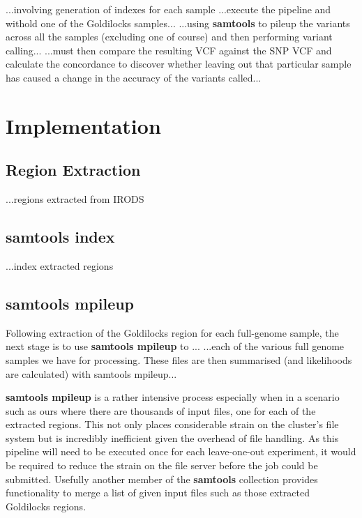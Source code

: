 
...involving generation of indexes for each sample
...execute the pipeline and withold one of the Goldilocks samples...
...using \textbf{samtools} to pileup the variants across all the samples
(excluding one of course) and then performing variant calling...
...must then compare the resulting VCF against the SNP VCF and calculate the
concordance to discover whether leaving out that particular sample has caused a
change in the accuracy of the variants called...


\section{Implementation}
\subsection{Region Extraction}

...regions extracted from IRODS


\subsection{samtools index}

...index extracted regions


\subsection{samtools mpileup}

Following extraction of the Goldilocks region for each full-genome sample, the
next stage is to use \textbf{samtools mpileup} to ...
...each of the various full genome samples we have for processing.  These files
are then summarised (and likelihoods are calculated) with samtools mpileup...

\textbf{samtools mpileup} is a rather intensive process especially when in a
scenario such as ours where there are thousands of input files, one for each of
the extracted regions. This not only places considerable strain on the cluster's
file system but is incredibly inefficient given the overhead of file handling.
As this pipeline will need to be executed once for each leave-one-out
experiment, it would be required to reduce the strain on the file server before
the job could be submitted. Usefully another member of the \textbf{samtools}
collection provides functionality to merge a list of given input files such as
those extracted Goldilocks regions.

